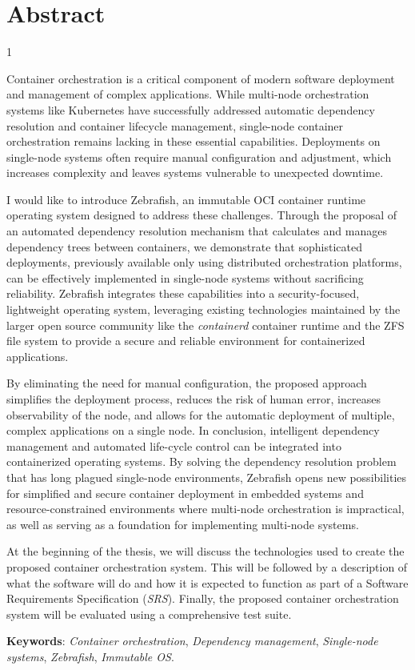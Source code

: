\chapter*{Abstract}
\begin{spacing}{1}

Container orchestration is a critical component of modern software deployment and management of complex applications. While multi-node orchestration systems like Kubernetes have successfully addressed automatic dependency resolution and container lifecycle management, single-node container orchestration remains lacking in these essential capabilities. Deployments on single-node systems often require manual configuration and adjustment, which increases complexity and leaves systems vulnerable to unexpected downtime.

I would like to introduce Zebrafish, an immutable OCI container runtime operating system designed to address these challenges. Through the proposal of an automated dependency resolution mechanism that calculates and manages dependency trees between containers, we demonstrate that sophisticated deployments, previously available only using distributed orchestration platforms, can be effectively implemented in single-node systems without sacrificing reliability. Zebrafish integrates these capabilities into a security-focused, lightweight operating system, leveraging existing technologies maintained by the larger open source community like the \textit{containerd} container runtime and the ZFS file system to provide a secure and reliable environment for containerized applications.

By eliminating the need for manual configuration, the proposed approach simplifies the deployment process, reduces the risk of human error, increases observability of the node, and allows for the automatic deployment of multiple, complex applications on a single node. In conclusion, intelligent dependency management and automated life-cycle control can be integrated into containerized operating systems. By solving the dependency resolution problem that has long plagued single-node environments, Zebrafish opens new possibilities for simplified and secure container deployment in embedded systems and resource-constrained environments where multi-node orchestration is impractical, as well as serving as a foundation for implementing multi-node systems.

At the beginning of the thesis, we will discuss the technologies used to create the proposed container orchestration system. This will be followed by a description of what the software will do and how it is expected to function as part of a Software Requirements Specification (\textit{SRS}). Finally, the proposed container orchestration system will be evaluated using a comprehensive test suite. 

\vskip 0.5cm

\textbf{Keywords}: \textit{Container orchestration}, \textit{Dependency management}, \textit{Single-node systems}, \textit{Zebrafish}, \textit{Immutable OS}.
\end{spacing}

\vfill
\dolgozatnyelve
{}